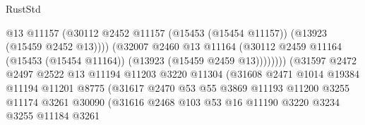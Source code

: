 \begin{lexlean}{RustStd}
\begin{coremodule}
                                            @13
                                            @11157
                                            (@30112
                                              @2452
                                              @11157
                                              (@15453 (@15454 @11157))
                                              (@13923 (@15459 @2452 @13))))
                                          (@32007
                                            @2460
                                            @13
                                            @11164
                                            (@30112
                                              @2459
                                              @11164
                                              (@15453 (@15454 @11164))
                                              (@13923 (@15459 @2459 @13))))))))
                                  (@31597
                                    @2472
                                    @2497
                                    @2522
                                    @13
                                    @11194
                                    @11203
                                    @3220
                                    @11304
                                    (@31608
                                      @2471
                                      @1014
                                      @19384
                                      @11194
                                      @11201
                                      @8775
                                      (@31617
                                        @2470
                                        @53
                                        @55
                                        @3869
                                        @11193
                                        @11200
                                        @3255
                                        @11174
                                        @3261
                                        @30090
                                        (@31616
                                          @2468
                                          @103
                                          @53
                                          @16
                                          @11190
                                          @3220
                                          @3234
                                          @3255
                                          @11184
                                          @3261

\end{coremodule}
\end{lexlean}

